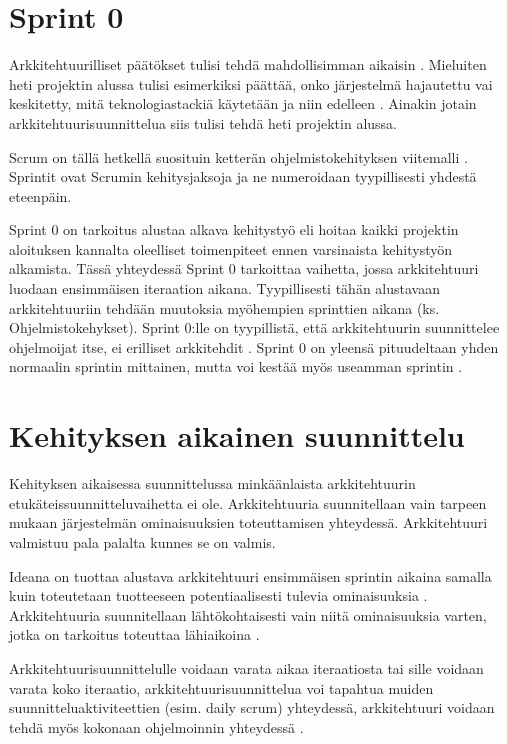 \section{Sprint 0}

Arkkitehtuurilliset päätökset tulisi tehdä mahdollisimman aikaisin \citep{abrahamsson2010agility}. Mieluiten heti projektin alussa tulisi esimerkiksi päättää, onko järjestelmä hajautettu vai keskitetty, mitä teknologiastackiä käytetään ja niin edelleen \citep{eloranta2015techniques}. Ainakin jotain arkkitehtuurisuunnittelua siis tulisi tehdä heti projektin alussa.

Scrum on tällä hetkellä suosituin ketterän ohjelmistokehityksen viitemalli \citep{noauthor_14th_2020}. Sprintit ovat Scrumin kehitysjaksoja ja ne numeroidaan tyypillisesti yhdestä eteenpäin.

Sprint 0 on tarkoitus alustaa alkava kehitystyö eli hoitaa kaikki projektin aloituksen kannalta oleelliset toimenpiteet ennen varsinaista kehitystyön alkamista. Tässä yhteydessä Sprint 0 tarkoittaa vaihetta, jossa arkkitehtuuri luodaan ensimmäisen iteraation aikana. Tyypillisesti tähän alustavaan arkkitehtuuriin tehdään muutoksia myöhempien sprinttien aikana (ks. Ohjelmistokehykset). Sprint 0:lle on tyypillistä, että arkkitehtuurin suunnittelee ohjelmoijat itse, ei erilliset arkkitehdit \citep{eloranta2015techniques}. Sprint 0 on yleensä pituudeltaan yhden normaalin sprintin mittainen, mutta voi kestää myös useamman sprintin \citep{prause_architectural_2012}.

\section{Kehityksen aikainen suunnittelu}
Kehityksen aikaisessa suunnittelussa minkäänlaista arkkitehtuurin etukäteissuunnitteluvaihetta ei ole. Arkkitehtuuria suunnitellaan vain tarpeen mukaan järjestelmän ominaisuuksien toteuttamisen yhteydessä. Arkkitehtuuri valmistuu pala palalta kunnes se on valmis.

Ideana on tuottaa alustava arkkitehtuuri ensimmäisen sprintin aikaina samalla kuin toteutetaan tuotteeseen potentiaalisesti tulevia ominaisuuksia \citep{eloranta2015techniques}. Arkkitehtuuria suunnitellaan lähtökohtaisesti vain niitä ominaisuuksia varten, jotka on tarkoitus toteuttaa lähiaikoina \citep{waterman_how_2015}. 

Arkkitehtuurisuunnittelulle voidaan varata aikaa iteraatiosta tai sille voidaan varata koko iteraatio, arkkitehtuurisuunnittelua voi tapahtua muiden suunnitteluaktiviteettien (esim. daily scrum) yhteydessä, arkkitehtuuri voidaan tehdä myös kokonaan ohjelmoinnin yhteydessä \citep{rost_distilling_2015}. 

